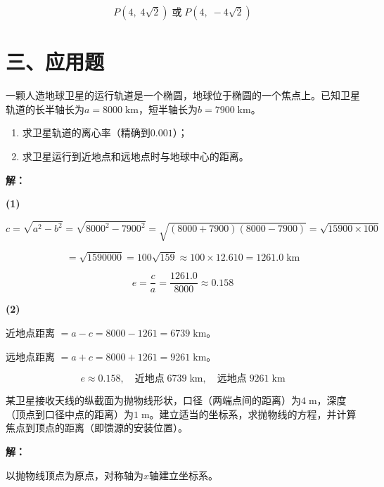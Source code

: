 \documentclass[12pt, a4paper]{ctexart}
\begin{document}
$$\boxed{P(4, \; 4\sqrt{2}) \;\text{或}\; P(4, \; -4\sqrt{2})}$$

\newpage

\section*{\textcolor{apppurple}{三、应用题}}

\begin{appbox}[【应用1】天体运行轨道]
一颗人造地球卫星的运行轨道是一个椭圆，地球位于椭圆的一个焦点上。已知卫星轨道的长半轴长为$a = 8000\;\text{km}$，短半轴长为$b = 7900\;\text{km}$。
\begin{enumerate}[leftmargin=1.5em]
  \item 求卫星轨道的离心率（精确到$0.001$）；
  \item 求卫星运行到近地点和远地点时与地球中心的距离。
\end{enumerate}
\end{appbox}

\textbf{解：}

\textbf{(1)}

$$c = \sqrt{a^2 - b^2} = \sqrt{8000^2 - 7900^2} = \sqrt{(8000+7900)(8000-7900)} = \sqrt{15900 \times 100}$$

$$= \sqrt{1590000} = 100\sqrt{159} \approx 100 \times 12.610 = 1261.0 \;\text{km}$$

$$e = \frac{c}{a} = \frac{1261.0}{8000} \approx 0.158$$

\textbf{(2)}

近地点距离 $= a - c = 8000 - 1261 = 6739\;\text{km}$。

远地点距离 $= a + c = 8000 + 1261 = 9261\;\text{km}$。

$$\boxed{e \approx 0.158, \quad \text{近地点}\; 6739\;\text{km}, \quad \text{远地点}\; 9261\;\text{km}}$$

\begin{appbox}[【应用2】卫星接收天线的抛物面]
某卫星接收天线的纵截面为抛物线形状，口径（两端点间的距离）为$4\;\text{m}$，深度（顶点到口径中点的距离）为$1\;\text{m}$。建立适当的坐标系，求抛物线的方程，并计算焦点到顶点的距离（即馈源的安装位置）。
\end{appbox}

\textbf{解：}

以抛物线顶点为原点，对称轴为$x$轴建立坐标系。
\end{document}
